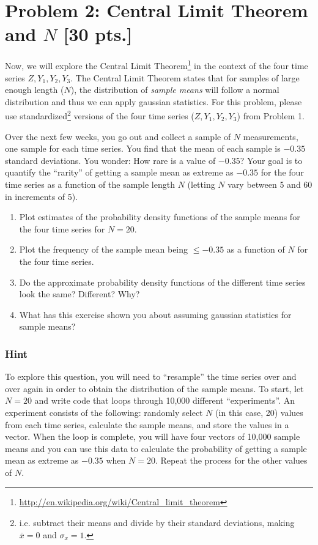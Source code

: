 \section*{Problem 2: Central Limit Theorem and $N$ [30 pts.]}
Now, we will explore the Central Limit Theorem\footnote{\url{http://en.wikipedia.org/wiki/Central_limit_theorem}} in the context of the four time series $Z, Y_1, Y_2, Y_3$. The Central Limit Theorem states that for samples of large enough length ($N$), the distribution of \textit{sample means} will follow a normal distribution and thus we can apply  gaussian statistics. For this problem, please use standardized\footnote{i.e. subtract their means and divide by their standard deviations, making $\overline{x} = 0$ and $\sigma_{x} = 1$.} versions of the four time series ($Z, Y_1, Y_2, Y_3$) from Problem 1.

Over the next few weeks, you go out and collect a sample of $N$ measurements, one sample for each time series. You find that the mean of each sample is $-0.35$ standard deviations. You wonder: How rare is a value of $-0.35$? Your goal is to quantify the ``rarity'' of getting a sample mean as extreme as $-0.35$ for the four time series as a function of the sample length $N$ (letting $N$ vary between 5 and 60 in increments of 5).

\begin{enumerate}
\item Plot estimates of the probability density functions of the sample means for the four time series for $N=20$.
\item Plot the frequency of the sample mean being $\le -0.35$ as a function of $N$ for the four time series.
\item Do the approximate probability density functions of the different time series look the same? Different? Why?
\item What has this exercise shown you about assuming gaussian statistics for sample means?
\end{enumerate}

\subsubsection*{Hint}
\vspace{-.2in}
To explore this question, you will need to ``resample'' the time series over and over again in order to obtain the distribution of the sample means. To start, let $N=20$ and write code that loops through 10,000 different ``experiments''. An experiment consists of the following: randomly select $N$ (in this case, 20) values from each time series, calculate the sample means, and store the values in a vector. When the loop is complete, you will have four vectors of 10,000 sample means and you can use this data to calculate the probability of getting a sample mean as extreme as $-0.35$ when $N=20$. Repeat the process for the other values of $N$.



